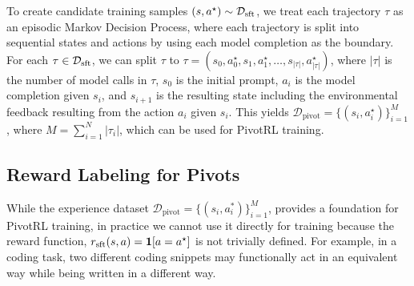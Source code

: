 To create candidate training samples $(s, a^\star) \sim \mathcal{D}_{\mathrm{sft}}$, we treat each trajectory $\tau$ as an episodic Markov Decision Process, where each trajectory is split into sequential states and actions by using each model completion as the boundary. For each $\tau \in \mathcal{D}_{\mathrm{sft}}$, we can split $\tau$ to $\tau = (s_0, a_0^\star, s_1, a_1^\star, \dots, s_{|\tau|}, a_{|\tau|}^\star)$, where $|\tau|$ is the number of model calls in $\tau$, $s_0$ is the initial prompt, $a_i$ is the model completion given $s_i$, and $s_{i+1}$ is the resulting state including the environmental feedback resulting from the action $a_i$ given $s_i$. This yields $\mathcal{D}_{\text{pivot}} = \{ (s_i, a_i^\star) \}_{i=1}^M$, where $M = \sum_{i=1}^N |\tau_i|$, which can be used for PivotRL training.




\subsection{Reward Labeling for Pivots}
While the experience dataset $\mathcal{D}_{\text{pivot}} = \{ (s_i, a_i^*) \}_{i=1}^M$, provides a foundation for PivotRL training, in practice we cannot use it directly for training because the reward function, $r_{\mathrm{sft}}(s, a) = \mathbf{1}[a = a^\star]$ is not trivially defined. For example, in a coding task, two different coding snippets may functionally act in an equivalent way while being written in a different way.

